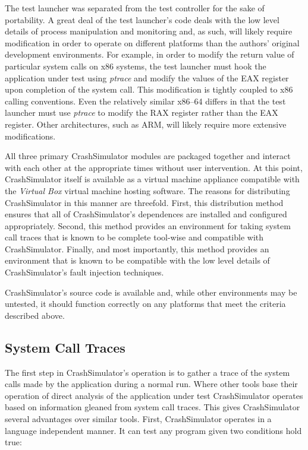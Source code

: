         The test launcher was separated from the test controller for the sake of portability. A great deal of the test
        launcher's code deals with the low level details of process manipulation and monitoring and, as such, will
        likely require modification in order to operate on different platforms than the authors' original development
        environments. For example, in order to modify the return value of particular system calls on x86 systems, the
        test launcher must hook the application under test using \emph{ptrace} and modify the values of the EAX register
        upon completion of the system call. This modification is tightly coupled to x86 calling conventions. Even the
        relatively similar x86--64 differs in that the test launcher must use \emph{ptrace} to modify the RAX register
        rather than the EAX register. Other architectures, such as ARM, will likely require more extensive
        modifications.

        All three primary CrashSimulator modules are packaged together and interact with each other at the appropriate
        times without user intervention. At this point, CrashSimulator itself is available as a virtual machine
        appliance compatible with the \emph{Virtual Box} virtual machine hosting software. The reasons for distributing
        CrashSimulator in this manner are threefold. First, this distribution method ensures that all of
        CrashSimulator's dependences are installed and configured appropriately. Second, this method provides an
        environment for taking system call traces that is known to be complete tool-wise and compatible with
        CrashSimulator. Finally, and most importantly, this method provides an environment that is known to be
        compatible with the low level details of CrashSimulator's fault injection techniques.

        CrashSimulator's source code is available and, while other environments may be untested, it should function
        correctly on any platforms that meet the criteria described above.

    \subsection{System Call Traces}

        The first step in CrashSimulator's operation is to gather a trace of the system calls made by the application
        during a normal run. Where other tools base their operation of direct analysis of the application under test
        CrashSimulator operates based on information gleaned from system call traces. This gives CrashSimulator several
        advantages over similar tools. First, CrashSimulator operates in a language independent manner. It can test any
        program given two conditions hold true:

